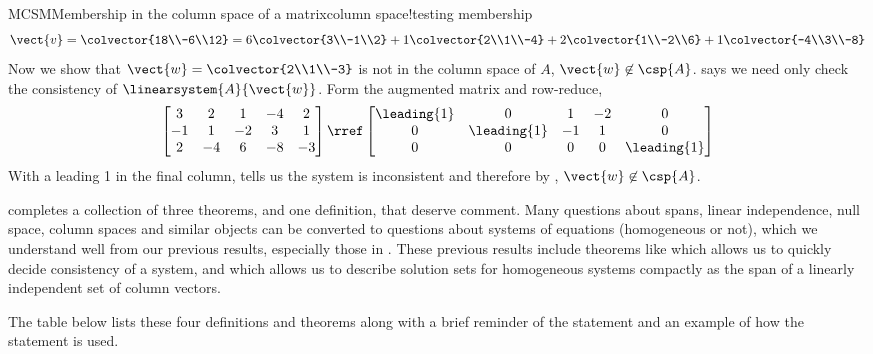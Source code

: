 \begin{example}{MCSM}{Membership in the column space of a matrix}{column space!testing membership}
%
\begin{equation*}
\vect{v}=\colvector{18\\-6\\12}=
6\colvector{3\\-1\\2}+
1\colvector{2\\1\\-4}+
2\colvector{1\\-2\\6}+
1\colvector{-4\\3\\-8}
\end{equation*}
%
Now we show that $\vect{w}=\colvector{2\\1\\-3}$ is not in the column space of $A$, $\vect{w}\not\in\csp{A}$.   says we need only check the consistency of $\linearsystem{A}{\vect{w}}$.  Form the augmented matrix and row-reduce,
%
\begin{equation*}
\begin{bmatrix}
3 & 2 & 1 & -4 & 2\\
-1 & 1 & -2 & 3 & 1\\
2 & -4 & 6 & -8 & -3
\end{bmatrix}
%
\rref
%
\begin{bmatrix}
\leading{1} & 0 & 1 & -2 & 0\\
0 & \leading{1} & -1 & 1 & 0\\
0 & 0 & 0 & 0 & \leading{1}
\end{bmatrix}
\end{equation*}
%
With a leading 1 in the final column,  tells us the system is inconsistent and therefore by , $\vect{w}\not\in\csp{A}$.
%
\end{example}
%
 completes a collection of three theorems, and one definition, that deserve comment.  Many questions about spans, linear independence, null space, column spaces and similar objects can be converted to questions about systems of equations (homogeneous or not), which we understand well from our previous results, especially those in .  These previous results include theorems like  which allows us to quickly decide consistency of a system, and  which allows us to describe solution sets for homogeneous systems compactly as the span of a linearly independent set of column vectors.\par
%
The table below lists these four definitions and theorems along with a brief reminder of the statement and an example of how the statement is used.
